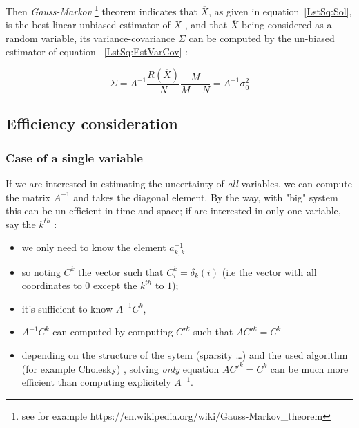 Then \emph{Gauss-Markov} \footnote{see for example https://en.wikipedia.org/wiki/Gauss-Markov\_theorem}
theorem indicates that $\overline X$, as given in equation~\ref{LstSq:Sol}, is the 
best linear unbiased estimator of $X$ , and that $\overline X$ being considered as a random
variable, its variance-covariance $\Sigma$ can be computed by the un-biased estimator of
equation ~\ref{LstSq:EstVarCov} :

\begin{equation}
	\Sigma = A^{-1}  \frac{R(\overline X)}{N}  \frac{M}{M-N} = A^{-1} \sigma_0^2 \label{LstSq:EstVarCov}
\end{equation}

\subsection{Efficiency consideration}

\subsubsection{Case of a single variable}

If we are interested in estimating the uncertainty of \emph{all} variables, we can
compute the matrix $A^{-1}$ and takes the diagonal element. By the way, with "big"
system this can be un-efficient in time and space; if are
interested in only one variable, say the $k^{th}$ :

\begin{itemize}
    \item  we only need to know the element $a^{-1}_{k,k}$
    \item  so noting $C^k$ the 
	   vector such that $C^k_i =\delta_k(i)$  (i.e the vector with all coordinates to $0$
           except  the $k^{th}$ to $1$);
    \item  it's sufficient to know $A^{-1} C^k$,
    \item  $A^{-1} C^k$ can computed by computing $C'^k$ such that $A C'^k = C^k$
    \item  depending on the structure of the sytem (sparsity \dots) and the used
	    algorithm (for example Cholesky) , solving \emph{only} equation $A C'^k = C^k$
		can be much more efficient than computing explicitely $A^{-1}$.
\end{itemize}


